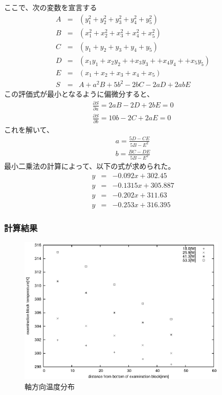 \documentclass[a4j,twoside,openright,11pt]{jarticle}
\begin{document}
ここで、次の変数を宣言する
\begin{eqnarray}
A&=&(y_1^2 + y_2^2 + y_3^2 + y_4^2 + y_5^2)\nonumber\\
B&=&(x_1^2 + x_2^2 + x_3^2 + x_4^2 + x_5^2)\nonumber\\
C&=&(y_1 + y_2 + y_3 + y_4 + y_5)\nonumber\\
D&=&(x_1y_1 + x_2y_2 + + x_3y_3 + + x_4y_4 + + x_5y_5) \nonumber\\
E&=&(x_1 + x_2 + x_3 + x_4 + x_5)\nonumber\\
S&=&A+a^2B+5b^2-2bC-2aD+2abE
\end{eqnarray}
この評価式が最小となるように偏微分すると、
\begin{eqnarray}
\frac{\partial S}{\partial a} = 2aB-2D+2bE = 0\nonumber\\
\frac{\partial S}{\partial b} = 10b-2C+2aE  = 0\nonumber
\end{eqnarray}
これを解いて、
\begin{eqnarray}
a=\frac{5D-CE}{5B-E^2}\nonumber\\
b=\frac{BC-DE}{5B-E^2}
\end{eqnarray}
最小二乗法の計算によって、以下の式が求められた。
\begin{eqnarray}
y&=&-0.092x+302.45\\
y&=&-0.1315x+305.887\\
y&=&-0.202x+311.63\\
y&=&-0.253x+316.395
\end{eqnarray}

\subsubsection{計算結果}
\begin{figure}[htbp]
\begin{center}
  \includegraphics[width=10cm]{./fulie/data.eps}
\end{center}
\caption{軸方向温度分布}
\end{figure}
\end{document}
